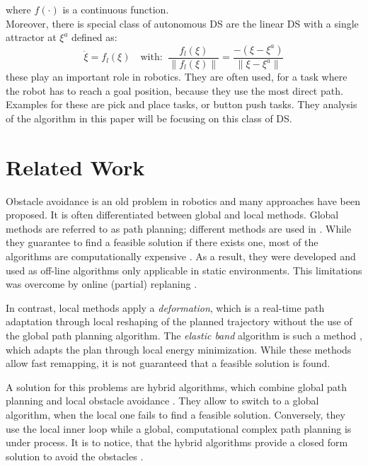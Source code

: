 where $f(\cdot)$ is a continuous function. \\

Moreover, there is special class of autonomous DS are the linear DS with a single attractor at $\xi^a$ defined as:
\begin{equation}
\dot \xi = f_l(\xi) \quad \text{with:} \;\; \frac{f_l(\xi)}{\| f_l(\xi) \|}  = \frac{-(\xi - \xi^a)}{\| \xi - \xi^a\|} \label{eq:DS_lin}
\end{equation}
these play an important role in robotics. They are often used, for a task where the robot has to reach a goal position, because they use the most direct path. Examples for these are pick and place tasks, or button push tasks. They analysis of the algorithm in this paper will be focusing on this class of DS.

\section{Related Work}
Obstacle avoidance is an old problem in robotics and many approaches have been proposed. It is often differentiated between global and local methods. Global methods are referred to as path planning; different methods are used in \cite{kavraki1996probabilistic,lozano1983spatial}. While they guarantee to find a feasible solution if there exists one, most of the algorithms are computationally expensive \cite{toussaint2009robot}. As a result, they were developed and used as off-line algorithms only applicable in static environments. This limitations was overcome by online (partial) replaning \cite{ferguson2006replanning,}.

In contrast, local methods apply a \textit{deformation}, which is a real-time path adaptation through local reshaping of the planned trajectory without the use of the global path planning algorithm. The \textit{elastic band} algorithm is such a method \cite{quinlan1993elastic, brock2002elastic}, which adapts the plan through local energy minimization. While these methods allow fast remapping, it is not guaranteed that a feasible solution is found.

A solution for this problems are hybrid algorithms, which combine global path planning and local obstacle avoidance \cite{yoshida2011reactive}. They allow to switch to a global algorithm, when the local one fails to find a feasible solution. Conversely, they use the local inner loop while a global, computational complex path planning is under process. It is to notice, that the hybrid algorithms provide a closed form solution to avoid the obstacles \cite{vannoy2008real,}.

